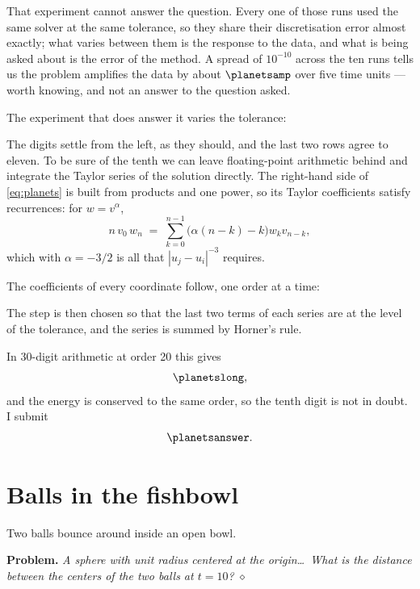 \documentclass[11pt]{article}
\newcommand{\diam}{\hfill$\diamond$}
\begin{document}
That experiment cannot answer the question. Every one of those runs used the
same solver at the same tolerance, so they share their discretisation error
almost exactly; what varies between them is the response to the data, and
what is being asked about is the error of the method. A spread of $10^{-10}$
across the ten runs tells us the problem amplifies the data by about
$\planetsamp$ over five time units --- worth knowing, and not an answer to
the question asked.

The experiment that does answer it varies the tolerance:

\begin{table}[htb]
\centerline{}
\caption{$|u_4(5)|$ against the tolerance asked of the integrator.}
\end{table}

The digits settle from the left, as they should, and the last two rows agree
to eleven. To be sure of the tenth we can leave floating-point arithmetic
behind and integrate the Taylor series of the solution directly. The
right-hand side of \eqref{eq:planets} is built from products and one power,
so its Taylor coefficients satisfy recurrences: for $w = v^{\alpha}$,
\[
   n\,v_0\,w_n \;=\; \sum_{k=0}^{n-1}\bigl(\alpha(n-k) - k\bigr) w_k v_{n-k} ,
\]
which with $\alpha = -3/2$ is all that $|u_j-u_i|^{-3}$ requires.



The coefficients of every coordinate follow, one order at a time:



The step is then chosen so that the last two terms of each series are at the
level of the tolerance, and the series is summed by Horner's rule.



In 30-digit arithmetic at order 20 this gives
\[
   \planetslong ,
\]
and the energy is conserved to the same order, so the tenth digit is not in
doubt. I submit
\[
   \planetsanswer .
\]

\section{Balls in the fishbowl}
Two balls bounce around inside an open bowl.

\noindent\textbf{Problem.} \emph{A sphere with unit radius centered at the
origin\ldots\ What is the distance between the centers of the two balls at
$t=10$?} \diam
\end{document}
